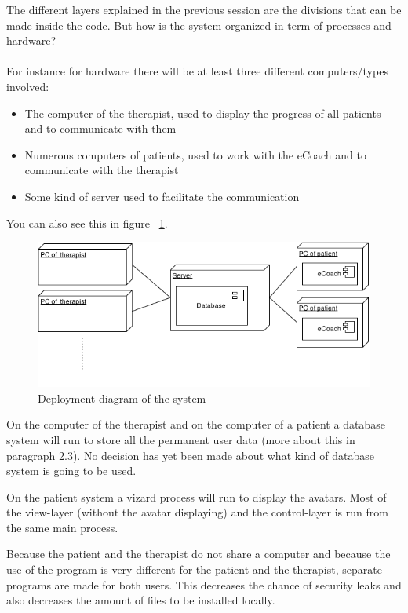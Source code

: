 
The different layers explained in the previous session are the divisions that can be made inside the code. But how is the system organized in term of processes and hardware? 
\paragraph{}
For instance for hardware there will be at least three different computers/types involved: 
\begin{itemize}
\item The computer of the therapist, used to display the progress of all patients and to communicate with them
\item Numerous computers of patients, used to work with the eCoach and to communicate with the therapist
\item Some kind of server used to facilitate the communication
\end{itemize}
You can also see this in figure ~\ref{fig:deploymentdiagram}.
\begin{figure}
  \centering
  \includegraphics[width=\textwidth]{deployment-diagram.png}
  \caption{Deployment diagram of the system} 
  \label{fig:deploymentdiagram}
\end{figure}
On the computer of the therapist and on the computer of a patient a database system will run to store all the permanent user data (more about this in paragraph 2.3).  No decision has yet been made about what kind of database system is going to be used.

On the patient system a vizard process will run to display the avatars. Most of the view-layer (without the avatar displaying) and the control-layer is run from the same main process. 

Because the patient and the therapist do not share a computer and because the use of the program is very different for the patient and the therapist, separate programs are made for both users. This decreases the chance of security leaks and also decreases the amount of files to be installed locally.


